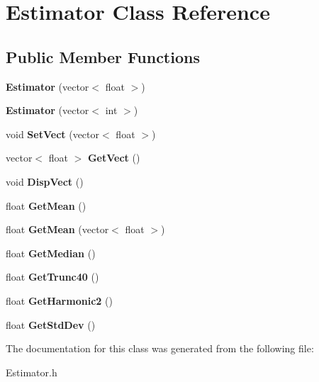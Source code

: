 \hypertarget{class_estimator}{}\section{Estimator Class Reference}
\label{class_estimator}
\subsection*{Public Member Functions}
\begin{DoxyCompactItemize}
\item 
\mbox{\label{class_estimator_ae4dfeb71c70a4889810d95fb58c5ac1f}} 
{\bfseries Estimator} (vector$<$ float $>$)
\item 
\mbox{\label{class_estimator_af35f131ccf377fde466536b5cf7fd34e}} 
{\bfseries Estimator} (vector$<$ int $>$)
\item 
\mbox{\label{class_estimator_a2c4e1baa01a7a9fbbba483c8da79323a}} 
void {\bfseries Set\+Vect} (vector$<$ float $>$)
\item 
\mbox{\label{class_estimator_adda7dff20ec92f70ef27fa5f411493ac}} 
vector$<$ float $>$ {\bfseries Get\+Vect} ()
\item 
\mbox{\label{class_estimator_a724bf50198b575c22d30e534510cfce9}} 
void {\bfseries Disp\+Vect} ()
\item 
\mbox{\label{class_estimator_a49eb378b7254482cd63c649b3df3e49b}} 
float {\bfseries Get\+Mean} ()
\item 
\mbox{\label{class_estimator_a95811e0bccdc7286c1794e1649c942f2}} 
float {\bfseries Get\+Mean} (vector$<$ float $>$)
\item 
\mbox{\label{class_estimator_a76b08bf7f6f60e3b105f09cb5a95c741}} 
float {\bfseries Get\+Median} ()
\item 
\mbox{\label{class_estimator_aa8392f901d358ca1bf7fcb3ebd1a72fc}} 
float {\bfseries Get\+Trunc40} ()
\item 
\mbox{\label{class_estimator_a0c7eb0f1ca4574b2985e10554bbf1f70}} 
float {\bfseries Get\+Harmonic2} ()
\item 
\mbox{\label{class_estimator_a0dc182eb1f1b3d1e8dda06f8bb72425c}} 
float {\bfseries Get\+Std\+Dev} ()
\end{DoxyCompactItemize}


The documentation for this class was generated from the following file\+:\begin{DoxyCompactItemize}
\item 
Estimator.\+h\end{DoxyCompactItemize}
